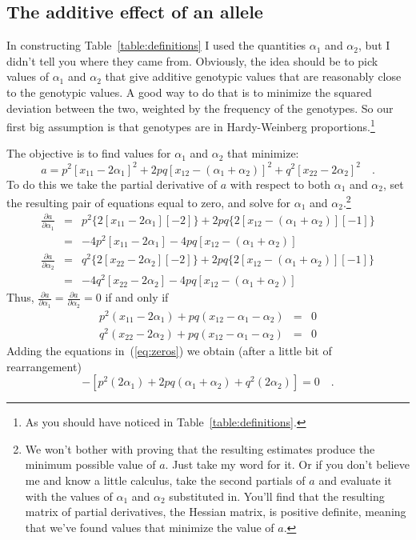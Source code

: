 \documentclass[12pt]{article}
\begin{document}
\subsection*{The additive effect of an allele}

In constructing Table~\ref{table:definitions} I used the quantities
$\alpha_1$ and $\alpha_2$, but I didn't tell you where they came
from. Obviously, the idea should be to pick values of $\alpha_1$ and
$\alpha_2$ that give additive genotypic values that are reasonably
close to the genotypic values. A good way to do that is to minimize
the squared deviation between the two, weighted by the frequency of
the genotypes. So our first big assumption is that genotypes are in
Hardy-Weinberg proportions.\footnote{As you should have noticed in
  Table~\ref{table:definitions}.}

The objective is to find values for $\alpha_1$ and $\alpha_2$ that
minimize:
\[
a = p^2[x_{11}-2\alpha_1]^2
       + 2pq[x_{12}-(\alpha_1+\alpha_2)]^2
       + q^2[x_{22}-2\alpha_2]^2 \quad .
\]
To do this we take the partial derivative of $a$ with respect to both
$\alpha_1$ and $\alpha_2$, set the resulting pair of equations equal
to zero, and solve for $\alpha_1$ and $\alpha_2$.\footnote{We won't
  bother with proving that the resulting estimates produce the minimum
  possible value of $a$. Just take my word for it. Or if you don't
  believe me and know a little calculus, take the second partials of
  $a$ and evaluate it with the values of $\alpha_1$ and $\alpha_2$
  substituted in. You'll find that the resulting matrix of partial
  derivatives, the Hessian matrix, is positive definite, meaning that
  we've found values that minimize the value of $a$.}
\begin{eqnarray*}
\frac{\partial a}{\partial{\alpha_1}} &=& p^2\{2[x_{11} - 2\alpha_1][-2]\}
                     + 2pq\{2[x_{12} - (\alpha_1+\alpha_2)][-1]\} \\
                  &=& -4p^2[x_{11} - 2\alpha_1]
                     -4pq[x_{12} - (\alpha_1+\alpha_2)] \\
\frac{\partial a}{\partial{\alpha_2}} &=& q^2\{2[x_{22} - 2\alpha_2][-2]\}
                     + 2pq\{2[x_{12} - (\alpha_1+\alpha_2)][-1]\} \\
                  &=& -4q^2[x_{22} - 2\alpha_2]
                     -4pq[x_{12} - (\alpha_1+\alpha_2)] 
\end{eqnarray*}
Thus, $\frac{\partial a}{\partial{\alpha_1}} = \frac{\partial a}{\partial{\alpha_2}} = 0$ if and only if
\begin{eqnarray}
p^2(x_{11} - 2\alpha_1) + pq(x_{12} - \alpha_1 - \alpha_2) &=& 0
  \nonumber \\
q^2(x_{22} - 2\alpha_2) + pq(x_{12} - \alpha_1 - \alpha_2) &=& 0
\label{eq:zeros}
\end{eqnarray}
Adding the equations in~(\ref{eq:zeros}) we obtain (after a little bit
of rearrangement)
\begin{equation}
[p^2x_{11} + 2pqx_{12} + q^2x_{22}] -
   [p^2(2\alpha_1) + 2pq(\alpha_1 + \alpha_2) + q^2(2\alpha_2)] = 0 \quad .
\label{eq:basic}
\end{equation}
\end{document}
